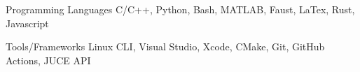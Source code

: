 

\begin{cvskills}

  \cvskill
    {Programming Languages} %
    {C/C++, Python, Bash, MATLAB, Faust, LaTex, Rust, Javascript} %

    \cvskill
    {Tools/Frameworks} %
    {Linux CLI, Visual Studio, Xcode, CMake, Git, GitHub Actions, JUCE API} %


\end{cvskills}

